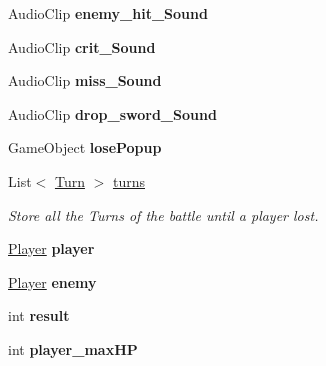 \begin{DoxyCompactItemize}
\item 
\mbox{\label{class_gameplay_accfeede9500530c26e0d05bd9e333894}} 
Audio\+Clip {\bfseries enemy\+\_\+hit\+\_\+\+Sound}
\item 
\mbox{\label{class_gameplay_a8ad8fc709889c1581412a46b5c648f2e}} 
Audio\+Clip {\bfseries crit\+\_\+\+Sound}
\item 
\mbox{\label{class_gameplay_aa5c98178b057b707fd6127c2823c803d}} 
Audio\+Clip {\bfseries miss\+\_\+\+Sound}
\item 
\mbox{\label{class_gameplay_aef5930170ca2cbd77a04c611bc3e81db}} 
Audio\+Clip {\bfseries drop\+\_\+sword\+\_\+\+Sound}
\item 
\mbox{\label{class_gameplay_a9891285ae11da63d4751760a82a161a4}} 
Game\+Object {\bfseries lose\+Popup}
\item 
\mbox{\label{class_gameplay_a835615e1b6b33c0340b1a6a00aff92ef}} 
List$<$ \mbox{\hyperlink{class_turn}{Turn}} $>$ \mbox{\hyperlink{class_gameplay_a835615e1b6b33c0340b1a6a00aff92ef}{turns}}
\begin{DoxyCompactList}\small\item\em Store all the Turns of the battle until a player lost. \end{DoxyCompactList}\item 
\mbox{\label{class_gameplay_a08bd2fb4dd769dfdb90d4627da35728a}} 
\mbox{\hyperlink{class_player}{Player}} {\bfseries player}
\item 
\mbox{\label{class_gameplay_a6879e0b49de984028dd0dae85873f20d}} 
\mbox{\hyperlink{class_player}{Player}} {\bfseries enemy}
\item 
\mbox{\label{class_gameplay_afb9326f06082e04ed20c8c08bd3b323c}} 
int {\bfseries result}
\item 
\mbox{\label{class_gameplay_a6a7bbaa555529ed618f3a699d9fba7da}} 
int {\bfseries player\+\_\+max\+HP}
\item 
\mbox{\label{class_gameplay_a30cf1b38be25e93296e9e12d5b1c7a1a}} 

\end{DoxyCompactItemize}
